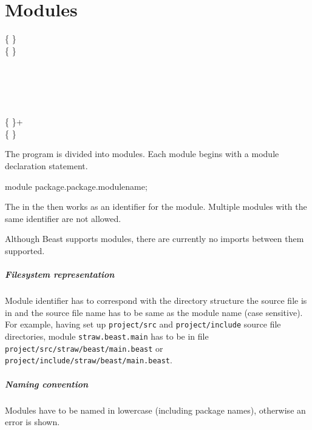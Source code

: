 \chapter{Modules}
\begin{grammar}
	   \kwd{;} \{  \} \\
	  \{   \} \\
	\\
	  \\
		\grAltLn {} \\
		\grAltLn {} \\
		\grAltLn {} \\
	 \{  \}+ \kwd{:} \\
	 \{  \} \kwd{\{}  \kwd{\}} \\
\end{grammar}

The program is divided into modules. Each module begins with a module declaration statement.
\begin{code}
module package.package.modulename;
\end{code}

The  in the  then works as an identifier for the module. Multiple modules with the same identifier are not allowed.

Although Beast supports modules, there are currently no imports between them supported.

\paragraph{Filesystem representation} Module identifier has to correspond with the directory structure the source file is in and the source file name has to be same as the module name (case sensitive). For example, having set up \verb|project/src| and \verb|project/include| source file directories, module \verb|straw.beast.main| has to be in file \verb|project/src/straw/beast/main.beast| or \verb|project/include/straw/beast/main.beast|.

\paragraph{Naming convention} Modules have to be named in lowercase (including package names), otherwise an error is shown.

